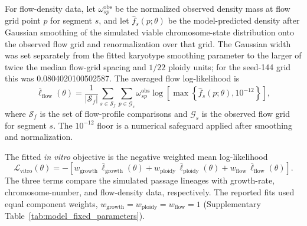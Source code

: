 \documentclass[11pt]{article}
\begin{document}
For flow-density data, let $\omega^{\mathrm{obs}}_{sp}$ be the normalized observed density mass at flow grid point $p$ for segment $s$, and let $\widehat f_s(p;\theta)$ be the model-predicted density after Gaussian smoothing of the simulated viable chromosome-state distribution onto the observed flow grid and renormalization over that grid. The Gaussian width was set separately from the fitted karyotype smoothing parameter to the larger of twice the median flow-grid spacing and $1/22$ ploidy units; for the seed-144 grid this was 0.0804020100502587. The averaged flow log-likelihood is
\begin{equation}
\bar\ell_{\mathrm{flow}}(\theta)
=
\frac{1}{|\mathcal S_f|}
\sum_{s\in\mathcal S_f}
\sum_{p\in\mathcal G_s}
 \omega^{\mathrm{obs}}_{sp}
 \log\left[\max\left\{\widehat f_s(p;\theta),10^{-12}\right\}\right],
\label{eq:appendix_invitro_flow_ll}
\end{equation}
where $\mathcal S_f$ is the set of flow-profile comparisons and $\mathcal G_s$ is the observed flow grid for segment $s$. The $10^{-12}$ floor is a numerical safeguard applied after smoothing and normalization.

The fitted \textit{in vitro} objective is the negative weighted mean log-likelihood
\begin{equation}
\mathcal L_{\mathrm{vitro}}(\theta)
=
-\left[
 w_{\mathrm{growth}}\,\bar\ell_{\mathrm{growth}}(\theta)
 +w_{\mathrm{ploidy}}\,\bar\ell_{\mathrm{ploidy}}(\theta)
 +w_{\mathrm{flow}}\,\bar\ell_{\mathrm{flow}}(\theta)
\right].
\label{eq:appendix_invitro_objective}
\end{equation}
The three terms compare the simulated passage lineages with growth-rate, chromosome-number, and flow-density data, respectively. The reported fits used equal component weights, $w_{\mathrm{growth}}=w_{\mathrm{ploidy}}=w_{\mathrm{flow}}=1$ (Supplementary Table~\ref{tab:model_fixed_parameters}).
\end{document}
